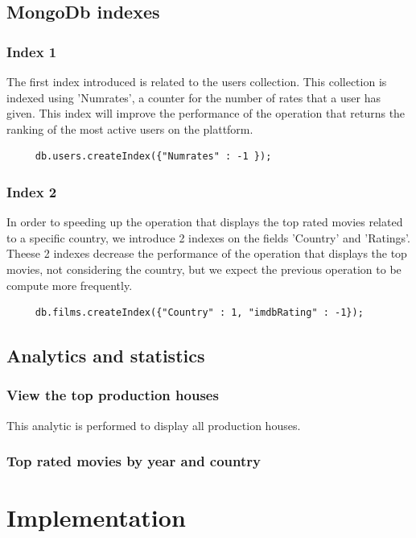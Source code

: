 \documentclass[a4paper, oneside]{article}
\begin{document}
\subsection{MongoDb indexes}
\subsubsection{Index 1}
The first index introduced is related to the users collection. This collection is indexed using 'Numrates', a counter for the number of rates that a user has given.
This index will improve the performance of the operation that returns the ranking of the most active users on the plattform.
\begin{verbatim}
     db.users.createIndex({"Numrates" : -1 });
\end{verbatim}
\subsubsection{Index 2}
In order to speeding up the operation that displays the top rated movies related to a specific country, we introduce 2 indexes on the fields 'Country' and 'Ratings'. Theese 2 indexes decrease the performance of the operation that displays the top movies, not considering the country, but we expect the previous operation to be compute more frequently.
\begin{verbatim}
     db.films.createIndex({"Country" : 1, "imdbRating" : -1});
\end{verbatim}

\subsection{Analytics and statistics}
\subsubsection{View the top production houses}
This analytic is performed to display all production houses.
\subsubsection{Top rated movies by year and country}



\clearpage

\section{Implementation}
\end{document}

